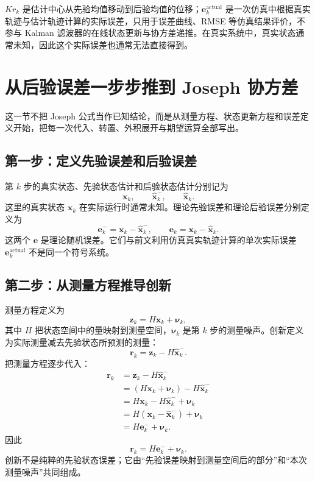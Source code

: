 \documentclass[UTF8,a4paper,11pt]{ctexart}
\newcommand{\prior}{^{-}}
\begin{document}
\begin{keybox}
$K r_k$ 是估计中心从先验均值移动到后验均值的位移；$\bm e_k^{\mathrm{actual}}$ 是一次仿真中根据真实轨迹与估计轨迹计算的实际误差，只用于误差曲线、RMSE 等仿真结果评价，不参与 Kalman 滤波器的在线状态更新与协方差递推。在真实系统中，真实状态通常未知，因此这个实际误差也通常无法直接得到。
\end{keybox}

\section{从后验误差一步步推到 Joseph 协方差}

这一节不把 Joseph 公式当作已知结论，而是从测量方程、状态更新方程和误差定义开始，把每一次代入、转置、外积展开与期望运算全部写出。

\subsection*{第一步：定义先验误差和后验误差}

第 $k$ 步的真实状态、先验状态估计和后验状态估计分别记为
\begin{equation}
\bm x_k,\qquad \hat{\bm x}_k\prior,\qquad \hat{\bm x}_k.
\end{equation}
这里的真实状态 $\bm x_k$ 在实际运行时通常未知。理论先验误差和理论后验误差分别定义为
\begin{equation}
\bm e_k\prior=\bm x_k-\hat{\bm x}_k\prior,
\qquad
\bm e_k=\bm x_k-\hat{\bm x}_k.
\end{equation}
这两个 $\bm e$ 是理论随机误差。它们与前文利用仿真真实轨迹计算的单次实际误差 $\bm e_k^{\mathrm{actual}}$ 不是同一个符号系统。

\subsection*{第二步：从测量方程推导创新}

测量方程定义为
\begin{equation}
\bm z_k=H\bm x_k+\bm\nu_k,
\end{equation}
其中 $H$ 把状态空间中的量映射到测量空间，$\bm\nu_k$ 是第 $k$ 步的测量噪声。创新定义为实际测量减去先验状态所预测的测量：
\begin{equation}
\bm r_k=\bm z_k-H\hat{\bm x}_k\prior.
\end{equation}
把测量方程逐步代入：
\begin{align}
\bm r_k
&=\bm z_k-H\hat{\bm x}_k\prior\\
&=(H\bm x_k+\bm\nu_k)-H\hat{\bm x}_k\prior\\
&=H\bm x_k-H\hat{\bm x}_k\prior+\bm\nu_k\\
&=H(\bm x_k-\hat{\bm x}_k\prior)+\bm\nu_k\\
&=H\bm e_k\prior+\bm\nu_k.
\end{align}
因此
\begin{equation}
\boxed{\bm r_k=H\bm e_k\prior+\bm\nu_k}.
\end{equation}
创新不是纯粹的先验状态误差；它由“先验误差映射到测量空间后的部分”和“本次测量噪声”共同组成。
\end{document}
